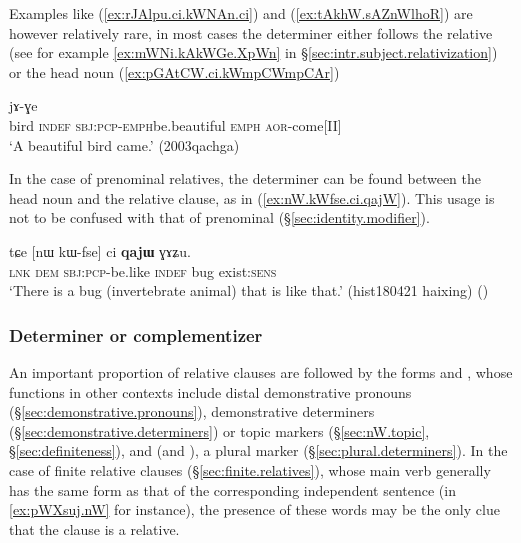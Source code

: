 Examples like (\ref{ex:rJAlpu.ci.kWNAn.ci}) and (\ref{ex:tAkhW.sAZnWlhoR}) are however relatively rare, in most cases the determiner either follows the relative (see for example  \ref{ex:mWNi.kAkWGe.XpWn} in §\ref{sec:intr.subject.relativization}) or the head noun (\ref{ex:pGAtCW.ci.kWmpCWmpCAr})
  
\begin{exe}
\ex \label{ex:pGAtCW.ci.kWmpCWmpCAr}
 jɤ-ɣe \\
bird \textsc{indef} \textsc{sbj}:\textsc{pcp}-\textsc{emph}\redp{}be.beautiful \textsc{emph} \textsc{aor}-come[II] \\
\glt `A beautiful bird came.' (2003qachga)
\end{exe} 

In the case of prenominal relatives, the determiner  can be found between the head noun and the relative clause, as in (\ref{ex:nW.kWfse.ci.qajW}). This usage is not to be confused with that of prenominal  (§\ref{sec:identity.modifier}).

\begin{exe}
\ex \label{ex:nW.kWfse.ci.qajW}
\gll tɕe [nɯ kɯ-fse] ci \textbf{qajɯ} ɣɤʑu. \\
\textsc{lnk} \textsc{dem} \textsc{sbj}:\textsc{pcp}-be.like \textsc{indef} bug exist:\textsc{sens} \\
\glt  `There is a bug (invertebrate animal) that is like that.' (hist180421 haixing)
()
\end{exe} 

\subsubsection{Determiner or complementizer} \label{sec:relative.determiners.complementizer}
An important proportion of relative clauses are followed by the forms  and , whose functions in other contexts include distal demonstrative pronouns (§\ref{sec:demonstrative.pronouns}), demonstrative determiners (§\ref{sec:demonstrative.determiners}) or topic markers (§\ref{sec:nW.topic}, §\ref{sec:definiteness}), and  (and ), a plural marker (§\ref{sec:plural.determiners}). In the case of finite relative clauses (§\ref{sec:finite.relatives}), whose main verb generally has the same form as that of the corresponding independent sentence (in \ref{ex:pWXsuj.nW} for instance), the presence of these words may be the only clue that the clause is a relative.

